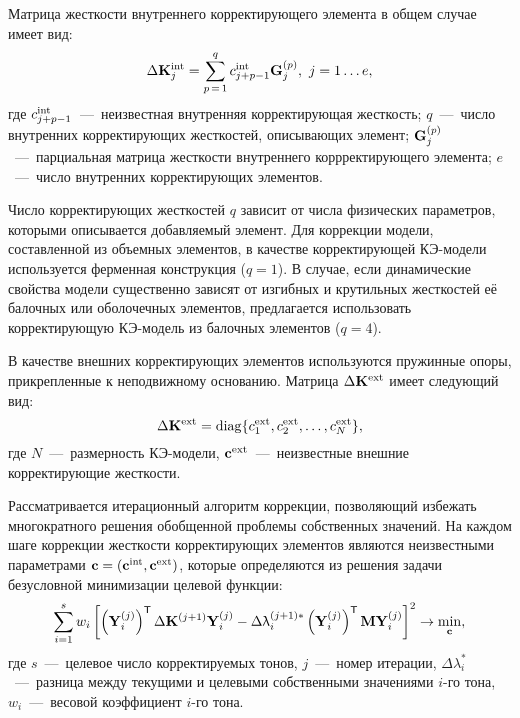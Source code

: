 Матрица жесткости внутреннего корректирующего элемента в общем случае имеет вид:
\begin{equation}
	\Delta \mathbf{K} ^ {\text{int}}_j = \sum\limits_{p\,=\,1}^{q} c ^ {\text{int}}_{j+p-1} \mathbf{G}_j^{(p)}, \ j = 1 \hdots e, \label{eq:internalStiffMatrix}
\end{equation}
где $ c ^ {\text{int}}_{j+p-1} $~---~неизвестная внутренняя корректирующая жесткость; $ q $~---~число внутренних корректирующих жесткостей, описывающих элемент; $ \mathbf{G}_j^{(p)} $~---~парциальная матрица жесткости внутреннего коррректирующего элемента; $ e $~---~число внутренних корректирующих элементов. 

Число корректирующих жесткостей $ q $ зависит от числа физических параметров, которыми описывается добавляемый элемент. Для коррекции модели, составленной из объемных элементов, в качестве корректирующей КЭ-модели используется ферменная конструкция ($ q = 1 $). В случае, если динамические свойства модели существенно зависят от изгибных и крутильных жесткостей её балочных или оболочечных элементов, предлагается использовать корректирующую КЭ-модель из балочных элементов ($ q = 4 $). 

В качестве внешних корректирующих элементов используются пружинные опоры, прикрепленные к неподвижному основанию. Матрица $ \Delta \mathbf{K} ^ {\text{ext}} $ имеет следующий вид:
\begin{equation}
	\Delta \mathbf{K} ^ {\text{ext}} = \operatorname{diag} \{ c ^ {\text{ext}}_1, c ^ {\text{ext}}_2, \hdots, c ^ {\text{ext}}_N \}, \label{eq:externalStiffMatrix}
\end{equation}
где $ N $~---~размерность КЭ-модели, $ \mathbf{c} ^ {\text{ext}} $~---~неизвестные внешние корректирующие жесткости. 

Рассматривается итерационный алгоритм коррекции, позволяющий избежать многократного решения обобщенной проблемы собственных значений. На каждом шаге коррекции жесткости корректирующих элементов являются неизвестными параметрами $ \mathbf{c} = \left( \mathbf{c} ^ {\text{int}}, \mathbf{c} ^ {\text{ext}} \right) $, которые определяются из решения задачи безусловной минимизации целевой функции:
\begin{gather}
	\sum\limits_{i = 1} ^ s w_i \left[ \left( \mathbf{Y}_i ^ {(j)} \right) ^ \mathsf{T} \Delta \mathbf{K} ^ {(j + 1)} \mathbf{Y}_i ^ {(j)} - \Delta \uplambda_i ^ {(j + 1) \ast} \left( \mathbf{Y}_i ^ {(j)} \right) ^ \mathsf{T} \mathbf{M} \mathbf{Y}_i ^ {(j)} \right] ^ 2 \rightarrow \min_{\mathbf{c}},
\end{gather}
где $ s $~---~целевое число корректируемых тонов, $ j $~---~номер итерации, $ \Delta \lambda_i ^ {\ast}$~---~разница между текущими и целевыми собственными значениями $ i $-го тона, $ w_i $~---~весовой коэффициент $ i $-го тона.

